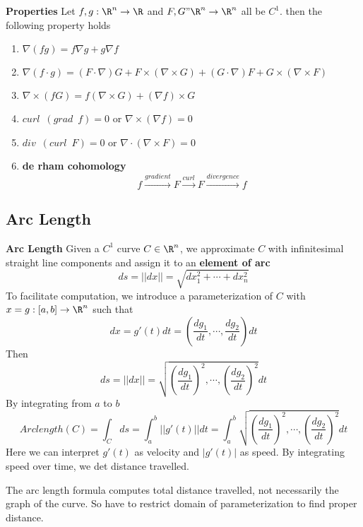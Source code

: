 \documentclass[11pt]{article}
\begin{document}
\begin{defn*}
  \textbf{Properties} Let $f, g: \R^n \to \R$ and $F, G" \R^n \to \R^n$ all be $C^1$. then the following property holds
  \begin{enumerate}
    \item $\nabla (fg) = f\nabla g + g \nabla f$
    \item $\nabla (f\cdot g) = (F\cdot \nabla)G + F\times (\nabla \times G) + (G\cdot \nabla)F + G\times (\nabla \times F) $
    \item $\nabla \times (fG) = f(\nabla \times G) + (\nabla f)\times G $
    \item $curl \enspace (grad \enspace f) = 0$ or $\nabla \times (\nabla f) = 0$
    \item $div \enspace (curl \enspace F) = 0$ or $\nabla \cdot (\nabla \times F) = 0$
    \item \textbf{de rham cohomology}
    \[
      f \xrightarrow{gradient} F \xrightarrow{curl} F \xrightarrow{divergence} f
    \]
  \end{enumerate}

\end{defn*}


\subsection*{Arc Length}

\begin{defn*}
  \textbf{Arc Length} Given a $C^1$ curve $C \in \R^n$, we approximate $C$ with infinitesimal straight line components and assign it to an \textbf{element of arc}
  \[
    ds = ||dx|| = \sqrt{dx_1^2 + \cdots + dx_n^2}
  \]
  To facilitate computation, we introduce a parameterization of $C$ with $x =  g:[a,b] \to \R^n$ such that
  \[
    dx = g'(t)dt = \left( \frac{dg_1}{dt},\cdots, \frac{dg_2}{dt}\right)dt
  \]
  Then
  \[
    ds = ||dx|| = \sqrt{ \left( \frac{dg_1}{dt} \right)^2,\cdots, \left(\frac{dg_2}{dt} \right)^2 }dt
  \]
  By integrating from $a$ to $b$
  \[
    Arclength(C) = \int_C ds = \int_a^b ||g'(t)||dt = \int_a^b \sqrt{ \left( \frac{dg_1}{dt} \right)^2,\cdots, \left(\frac{dg_2}{dt} \right)^2 }dt
  \]
  Here we can interpret $g'(t)$ as velocity and $|g'(t)|$ as speed. By integrating speed over time, we det distance travelled.
  \begin{rem}
    The arc length formula computes total distance travelled, not necessarily the graph of the curve. So have to restrict domain of parameterization to find proper distance.
  \end{rem}
\end{defn*}
\end{document}

